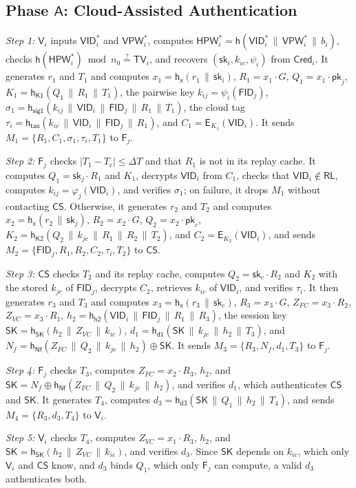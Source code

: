 \documentclass[journal]{IEEEtran}
\theoremstyle{plain}
\theoremstyle{definition}
\newcommand{\Veh}{\mathsf{V}}            %
\newcommand{\Fog}{\mathsf{F}}            %
\newcommand{\CS}{\mathsf{CS}}            %
\newcommand{\SK}{\mathsf{SK}}            %
\newcommand{\VID}{\mathsf{VID}}          %
\newcommand{\FID}{\mathsf{FID}}          %
\newcommand{\VPW}{\mathsf{VPW}}          %
\newcommand{\HPW}{\mathsf{HPW}}          %
\newcommand{\TV}{\mathsf{TV}}            %
\newcommand{\Cred}{\mathsf{Cred}}        %
\newcommand{\RL}{\mathsf{RL}}            %
\newcommand{\h}{\mathsf{h}}              %
\newcommand{\hT}[1]{\h_{\mathsf{#1}}}     %
\newcommand{\Enc}{\mathsf{E}}            %
\newcommand{\sk}{\mathsf{sk}}            %
\newcommand{\pk}{\mathsf{pk}}            %
\newcommand{\cat}{\,\|\,}               %
\newcommand{\chk}{\stackrel{?}{=}}
\begin{document}
\subsection{Phase \texorpdfstring{$\mathsf{A}$}{A}: Cloud-Assisted Authentication}\label{sec:phaseA}

\emph{Step 1:} $\Veh_i$ inputs $\VID_i^*$ and $\VPW_i^*$, computes $\HPW_i^*=\h(\VID_i^*\cat\VPW_i^*\cat b_i)$, checks $\h(\HPW_i^*)\bmod n_0\chk\TV_i$, and recovers $(\sk_i,k_{ic},\psi_i)$ from $\Cred_i$. It generates $r_1$ and $T_1$ and computes $x_1=\hT{x}(r_1\cat\sk_i)$, $R_1=x_1\cdot G$, $Q_1=x_1\cdot\pk_j$, $K_1=\hT{K1}(Q_1\cat R_1\cat T_1)$, the pairwise key $k_{ij}=\psi_i(\FID_j)$, $\sigma_1=\hT{sig1}(k_{ij}\cat\VID_i\cat\FID_j\cat R_1\cat T_1)$, the cloud tag $\tau_i=\hT{tau}(k_{ic}\cat\VID_i\cat\FID_j\cat R_1)$, and $C_1=\Enc_{K_1}(\VID_i)$. It sends $M_1=\{R_1,C_1,\sigma_1,\tau_i,T_1\}$ to $\Fog_j$.

\emph{Step 2:} $\Fog_j$ checks $|T_1-T_c|\le\Delta T$ and that $R_1$ is not in its replay cache. It computes $Q_1=\sk_j\cdot R_1$ and $K_1$, decrypts $\VID_i$ from $C_1$, checks that $\VID_i\notin\RL$, computes $k_{ij}=\varphi_j(\VID_i)$, and verifies $\sigma_1$; on failure, it drops $M_1$ without contacting $\CS$. Otherwise, it generates $r_2$ and $T_2$ and computes $x_2=\hT{x}(r_2\cat\sk_j)$, $R_2=x_2\cdot G$, $Q_2=x_2\cdot\pk_c$, $K_2=\hT{K2}(Q_2\cat k_{jc}\cat R_1\cat R_2\cat T_2)$, and $C_2=\Enc_{K_2}(\VID_i)$, and sends $M_2=\{\FID_j,R_1,R_2,C_2,\tau_i,T_2\}$ to $\CS$.

\emph{Step 3:} $\CS$ checks $T_2$ and its replay cache, computes $Q_2=\sk_c\cdot R_2$ and $K_2$ with the stored $k_{jc}$ of $\FID_j$, decrypts $C_2$, retrieves $k_{ic}$ of $\VID_i$, and verifies $\tau_i$. It then generates $r_3$ and $T_3$ and computes $x_3=\hT{x}(r_3\cat\sk_c)$, $R_3=x_3\cdot G$, $Z_{FC}=x_3\cdot R_2$, $Z_{VC}=x_3\cdot R_1$, $h_2=\hT{h2}(\VID_i\cat\FID_j\cat R_1\cat R_3)$, the session key $\SK=\hT{SK}(h_2\cat Z_{VC}\cat k_{ic})$, $d_1=\hT{d1}(\SK\cat k_{jc}\cat h_2\cat T_3)$, and $N_f=\hT{Nf}(Z_{FC}\cat Q_2\cat k_{jc}\cat h_2)\oplus\SK$. It sends $M_3=\{R_3,N_f,d_1,T_3\}$ to $\Fog_j$.

\emph{Step 4:} $\Fog_j$ checks $T_3$, computes $Z_{FC}=x_2\cdot R_3$, $h_2$, and $\SK=N_f\oplus\hT{Nf}(Z_{FC}\cat Q_2\cat k_{jc}\cat h_2)$, and verifies $d_1$, which authenticates $\CS$ and $\SK$. It generates $T_4$, computes $d_3=\hT{d3}(\SK\cat Q_1\cat h_2\cat T_4)$, and sends $M_4=\{R_3,d_3,T_4\}$ to $\Veh_i$.

\emph{Step 5:} $\Veh_i$ checks $T_4$, computes $Z_{VC}=x_1\cdot R_3$, $h_2$, and $\SK=\hT{SK}(h_2\cat Z_{VC}\cat k_{ic})$, and verifies $d_3$. Since $\SK$ depends on $k_{ic}$, which only $\Veh_i$ and $\CS$ know, and $d_3$ binds $Q_1$, which only $\Fog_j$ can compute, a valid $d_3$ authenticates both.
\end{document}
